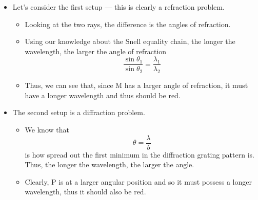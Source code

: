 \documentclass[a4paper,12pt]{article}
\begin{document}
\begin{itemize}
  \item Let's consider the first setup --- this is clearly a refraction problem.
        \begin{itemize}
          \item Looking at the two rays, the difference is the angles of refraction.
          \item Using our knowledge about the Snell equality chain, the longer the wavelength, the larger the angle of refraction$$\frac{\sin\theta_1}{\sin\theta_2} = \frac{\lambda_1}{\lambda_2}$$
          \item Thus, we can see that, since M has a larger angle of refraction, it must have a longer wavelength and thus should be red.
        \end{itemize}
  \item The second setup is a diffraction problem.
        \begin{itemize}
          \item We know that $$\theta = \frac{\lambda}{b}$$is how spread out the first minimum in the diffraction grating pattern is. Thus, the longer the wavelength, the larger the angle.
          \item Clearly, P is at a larger angular position and so it must possess a longer wavelength, thus it should also be red.
        \end{itemize}
\end{itemize}
\end{document}
